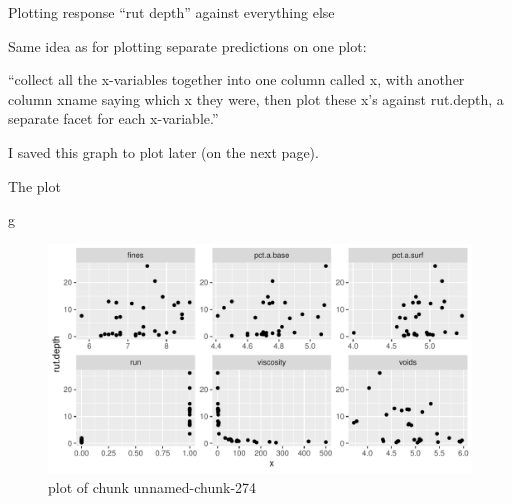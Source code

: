 \documentclass[
  ignorenonframetext,
]{beamer}
\newenvironment{Shaded}{\begin{snugshade}}{\end{snugshade}}
\newcommand{\DataTypeTok}[1]{\textcolor[rgb]{0.13,0.29,0.53}{#1}}
\newcommand{\KeywordTok}[1]{\textcolor[rgb]{0.13,0.29,0.53}{\textbf{#1}}}
\newcommand{\NormalTok}[1]{#1}
\newcommand{\OperatorTok}[1]{\textcolor[rgb]{0.81,0.36,0.00}{\textbf{#1}}}
\newcommand{\StringTok}[1]{\textcolor[rgb]{0.31,0.60,0.02}{#1}}
\begin{document}
\begin{frame}[fragile]{Plotting response ``rut depth'' against
everything else}
\protect\hypertarget{plotting-response-rut-depth-against-everything-else}{}

Same idea as for plotting separate predictions on one plot:

\begin{Shaded}
\end{Shaded}

``collect all the x-variables together into one column called x, with
another column xname saying which x they were, then plot these x's
against rut.depth, a separate facet for each x-variable.''

I saved this graph to plot later (on the next page).

\end{frame}

\begin{frame}[fragile]{The plot}
\protect\hypertarget{the-plot-2}{}

\begin{Shaded}
\begin{Highlighting}[]
\NormalTok{g}
\end{Highlighting}
\end{Shaded}

\begin{figure}
\centering
\includegraphics{figure/unnamed-chunk-274-1.pdf}
\caption{plot of chunk unnamed-chunk-274}
\end{figure}

\end{frame}
\end{document}
